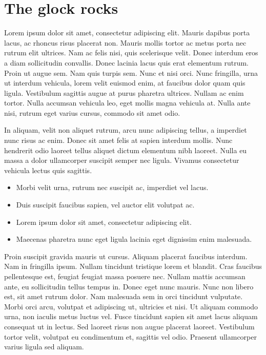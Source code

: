 \documentclass{article}
\begin{document}
\section{The glock rocks}\hypertarget{the-glock-rocks}{}\label{the-glock-rocks}

Lorem ipsum dolor sit amet, consectetur adipiscing elit. Mauris dapibus porta lacus, ac rhoncus risus placerat non. Mauris mollis tortor ac metus porta nec rutrum elit ultrices. Nam ac felis nisi, quis scelerisque velit. Donec interdum eros a diam sollicitudin convallis. Donec lacinia lacus quis erat elementum rutrum. Proin ut augue sem. Nam quis turpis sem. Nunc et nisi orci. Nunc fringilla, urna ut interdum vehicula, lorem velit euismod enim, at faucibus dolor quam quis ligula. Vestibulum sagittis augue at purus pharetra ultrices. Nullam ac enim tortor. Nulla accumsan vehicula leo, eget mollis magna vehicula at. Nulla ante nisi, rutrum eget varius cursus, commodo sit amet odio.


In aliquam, velit non aliquet rutrum, arcu nunc adipiscing tellus, a imperdiet nunc risus ac enim. Donec sit amet felis at sapien interdum mollis. Nunc hendrerit odio laoreet tellus aliquet dictum elementum nibh laoreet. Nulla eu massa a dolor ullamcorper suscipit semper nec ligula. Vivamus consectetur vehicula lectus quis sagittis.

\begin{itemize}
\item Morbi velit urna, rutrum nec suscipit ac, imperdiet vel lacus.
\item Duis suscipit faucibus sapien, vel auctor elit volutpat ac.
\item Lorem ipsum dolor sit amet, consectetur adipiscing elit.
\item Maecenas pharetra nunc eget ligula lacinia eget dignissim enim malesuada.
\end{itemize}

Proin suscipit gravida mauris ut cursus. Aliquam placerat faucibus interdum. Nam in fringilla ipsum. Nullam tincidunt tristique lorem et blandit. Cras faucibus pellentesque est, feugiat feugiat massa posuere nec. Nullam mattis accumsan ante, eu sollicitudin tellus tempus in. Donec eget nunc mauris. Nunc non libero est, sit amet rutrum dolor. Nam malesuada sem in orci tincidunt vulputate. Morbi orci arcu, volutpat et adipiscing ut, ultricies et nisi. Ut aliquam commodo urna, non iaculis metus luctus vel. Fusce tincidunt sapien sit amet lacus aliquam consequat ut in lectus. Sed laoreet risus non augue placerat laoreet. Vestibulum tortor velit, volutpat eu condimentum et, sagittis vel odio. Praesent ullamcorper varius ligula sed aliquam.
\end{document}
